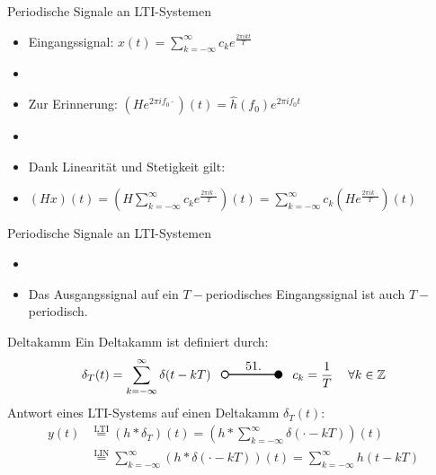 \documentclass[14pt, aspectratio=169, handout]{beamer}
\newcommand{\transform}[2]{%
    \begin{tikzpicture}
        \draw[thick] (0,0) circle (0.1);
        \draw[thick] (0.1,0) -- (#2,0) node[midway, above] {#1};
        \filldraw[thick] (#2,0) circle (0.1);
    \end{tikzpicture}%
}
\begin{document}
\begin{frame}{Periodische Signale an LTI-Systemen}
    \begin{itemize}
        \item[] Eingangssignal: $x(t) = \displaystyle\sum_{k = -\infty}^{\infty} c_k e^{\frac{2 \pi i k t}{T}}$
        \item[] 
        \item[] Zur Erinnerung: $\left(H \displaystyle e^{2 \pi i f_0 \cdot}\right)(t) = \hat{h}(f_0) e^{2 \pi i f_0 t}$
        \item[] 
        \item[] Dank Linearität und Stetigkeit gilt:
        \item[] $\left(H x\right)(t) = \left(H \displaystyle\sum_{k = -\infty}^{\infty} c_k e^{\frac{2 \pi i k \cdot}{T}}\right)(t) = \displaystyle\sum_{k = -\infty}^{\infty} c_k \left(He^{\frac{2 \pi i k \cdot}{T}}\right)(t)$
    \end{itemize}
\end{frame}

\begin{frame}{Periodische Signale an LTI-Systemen}
    \begin{itemize}
    \item[] 
    \item Das Ausgangssignal auf ein $T-$periodisches Eingangssignal ist auch $T-$periodisch.
    \end{itemize}
\end{frame}

\begin{frame}{Deltakamm}
    Ein Deltakamm ist definiert durch:
    $$\delta_T(t) = \sum_{k = -\infty}^{\infty} \delta(t-kT) \hspace{8pt} \transform{51.}{1.5} \hspace{8pt} c_k = \frac{1}{T} \hspace{12pt} \forall k \in \mathbb{Z}$$
    Antwort eines LTI-Systems auf einen Deltakamm $\delta_T(t)$:
    \begin{align*}
        y(t) &\overset{\text{LTI}}{=} (h \ast \delta_T)(t) = \left(h \ast \sum_{k = -\infty}^\infty \delta(\cdot - kT) \right)(t) \\
        &\overset{\text{LIN}}{=} \sum_{k = -\infty}^\infty \left(h \ast \delta(\cdot - kT)\right)(t) = \sum_{k = -\infty}^\infty h(t-kT)
    \end{align*}
\end{frame}
\end{document}
